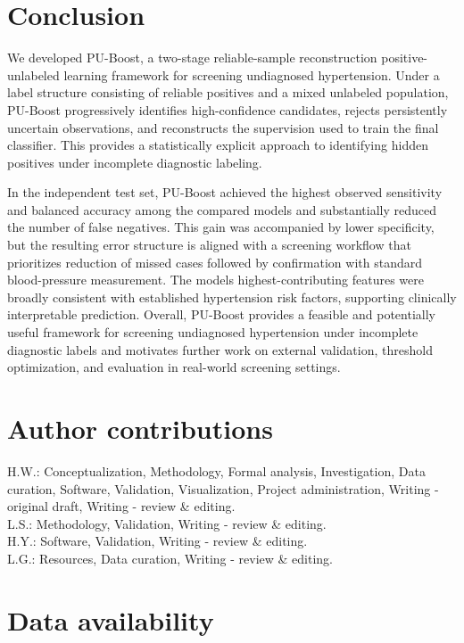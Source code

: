 \documentclass[10pt]{article}
\begin{document}
\section{Conclusion}

We developed PU-Boost, a two-stage reliable-sample reconstruction
positive-unlabeled learning framework for screening undiagnosed
hypertension. Under a label structure consisting of reliable positives
and a mixed unlabeled population, PU-Boost progressively identifies
high-confidence candidates, rejects persistently uncertain observations,
and reconstructs the supervision used to train the final classifier.
This provides a statistically explicit approach to identifying hidden
positives under incomplete diagnostic labeling.

In the independent test set, PU-Boost achieved the highest observed
sensitivity and balanced accuracy among the compared models and
substantially reduced the number of false negatives. This gain was
accompanied by lower specificity, but the resulting error structure is
aligned with a screening workflow that prioritizes reduction of missed
cases followed by confirmation with standard blood-pressure measurement.
The model\textquotesingle s highest-contributing features were broadly
consistent with established hypertension risk factors, supporting
clinically interpretable prediction. Overall, PU-Boost provides a
feasible and potentially useful framework for screening undiagnosed
hypertension under incomplete diagnostic labels and motivates further
work on external validation, threshold optimization, and evaluation in
real-world screening settings.

\section*{Author contributions}

H.W.: Conceptualization, Methodology, Formal analysis, Investigation,
Data curation, Software, Validation, Visualization, Project
administration, Writing - original draft, Writing - review \& editing.\\
L.S.: Methodology, Validation, Writing - review \& editing.\\
H.Y.: Software, Validation, Writing - review \& editing.\\
L.G.: Resources, Data curation, Writing - review \& editing.

\section*{Data availability}
\end{document}
